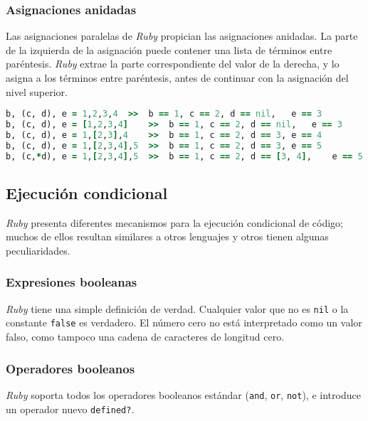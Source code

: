 \subsubsection{Asignaciones anidadas}
Las asignaciones paralelas de \textit{Ruby} propician las asignaciones anidadas. La parte de la izquierda de la asignación puede contener una lista de términos entre paréntesis. \textit{Ruby} extrae la parte correspondiente del valor de la derecha, y lo asigna a los términos entre paréntesis, antes de continuar con la asignación del nivel superior.

\begin{lstlisting}[language=Ruby]
b, (c, d), e = 1,2,3,4	>>	b == 1,	c == 2,	d == nil,	e == 3
b, (c, d), e = [1,2,3,4]	>>	b == 1,	c == 2,	d == nil,	e == 3
b, (c, d), e = 1,[2,3],4	>>	b == 1,	c == 2,	d == 3,	e == 4
b, (c, d), e = 1,[2,3,4],5	>>	b == 1,	c == 2,	d == 3,	e == 5
b, (c,*d), e = 1,[2,3,4],5	>>	b == 1,	c == 2,	d == [3, 4],	e == 5
\end{lstlisting}

\subsection{Ejecución condicional}
\textit{Ruby} presenta diferentes mecanismos para la ejecución condicional de código; muchos de ellos resultan similares a otros lenguajes y otros tienen algunas peculiaridades. 

\subsubsection{Expresiones booleanas}
\textit{Ruby} tiene una simple definición de verdad. Cualquier valor que no es \texttt{nil} o la constante \texttt{false} es verdadero. El número cero no está interpretado como un valor falso, como tampoco una cadena de caracteres de longitud cero.

\subsubsection{Operadores booleanos}
\textit{Ruby} soporta todos los operadores booleanos estándar (\texttt{and}, \texttt{or}, \texttt{not}), e introduce un operador nuevo \texttt{defined?}.

